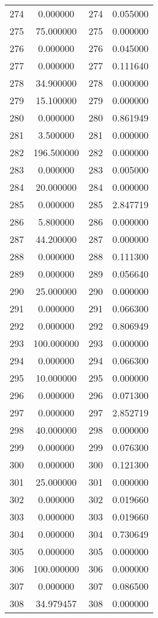 \documentclass[12pt]{article}
\begin{document}
\begin{longtable}{@{}cccc@{}}
274 & 0.000000 & 274 & 0.055000 \\
275 & 75.000000 & 275 & 0.000000 \\
276 & 0.000000 & 276 & 0.045000 \\
277 & 0.000000 & 277 & 0.111640 \\
278 & 34.900000 & 278 & 0.000000 \\
279 & 15.100000 & 279 & 0.000000 \\
280 & 0.000000 & 280 & 0.861949 \\
281 & 3.500000 & 281 & 0.000000 \\
282 & 196.500000 & 282 & 0.000000 \\
283 & 0.000000 & 283 & 0.005000 \\
284 & 20.000000 & 284 & 0.000000 \\
285 & 0.000000 & 285 & 2.847719 \\
286 & 5.800000 & 286 & 0.000000 \\
287 & 44.200000 & 287 & 0.000000 \\
288 & 0.000000 & 288 & 0.111300 \\
289 & 0.000000 & 289 & 0.056640 \\
290 & 25.000000 & 290 & 0.000000 \\
291 & 0.000000 & 291 & 0.066300 \\
292 & 0.000000 & 292 & 0.806949 \\
293 & 100.000000 & 293 & 0.000000 \\
294 & 0.000000 & 294 & 0.066300 \\
295 & 10.000000 & 295 & 0.000000 \\
296 & 0.000000 & 296 & 0.071300 \\
297 & 0.000000 & 297 & 2.852719 \\
298 & 40.000000 & 298 & 0.000000 \\
299 & 0.000000 & 299 & 0.076300 \\
300 & 0.000000 & 300 & 0.121300 \\
301 & 25.000000 & 301 & 0.000000 \\
302 & 0.000000 & 302 & 0.019660 \\
303 & 0.000000 & 303 & 0.019660 \\
304 & 0.000000 & 304 & 0.730649 \\
305 & 0.000000 & 305 & 0.000000 \\
306 & 100.000000 & 306 & 0.000000 \\
307 & 0.000000 & 307 & 0.086500 \\
308 & 34.979457 & 308 & 0.000000 \\

\end{longtable}
\end{document}
